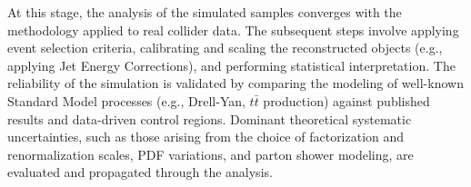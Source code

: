 At this stage, the analysis of the simulated samples converges with the methodology applied to real collider data. The subsequent steps involve applying event selection criteria, calibrating and scaling the reconstructed objects (e.g., applying Jet Energy Corrections), and performing statistical interpretation. The reliability of the simulation is validated by comparing the modeling of well-known Standard Model processes (e.g., Drell-Yan, $t\bar{t}$ production) against published results and data-driven control regions. Dominant theoretical systematic uncertainties, such as those arising from the choice of factorization and renormalization scales, PDF variations, and parton shower modeling, are evaluated and propagated through the analysis.

